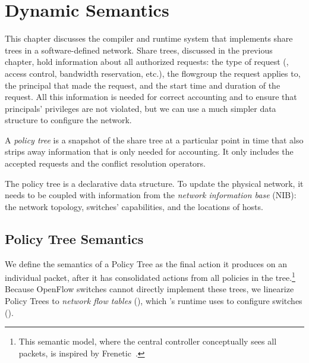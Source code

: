 \chapter{Dynamic Semantics}
\label{sec:PolicyTrees}


This chapter discusses the \sys compiler and runtime system that
implements share trees in a software-defined network.  Share trees,
discussed in the previous chapter, hold information about all
authorized requests: the type of request (\eg, access control,
bandwidth reservation, etc.), the flowgroup the request applies to,
the principal that made the request, and the start time and duration
of the request. All this information is needed for correct accounting
and to ensure that principals' privileges are not violated, but we can
use a much simpler data structure to configure the network.

  A \emph{policy tree} is a snapshot of
the share tree at a particular point in time that also strips away
information that is only needed for accounting. It only includes the
accepted requests and the conflict resolution operators.

The policy tree is a declarative data structure. To update the physical
network, it needs to be coupled with information from the
\emph{network information base} (NIB): the network topology, switches'
capabilities, and the locations of hosts.

\section{Policy Tree Semantics}
\label{sec:PolicyTree-Semantics}

We define the semantics of a Policy Tree as the
final action it produces on an individual packet, after it has
consolidated actions from all policies in the tree.\footnote{This
  semantic model, where the central controller conceptually sees all
  packets, is inspired by Frenetic~\cite{Foster:2010}.}
Because OpenFlow switches cannot directly implement these trees,
we linearize Policy Trees to \emph{network flow tables} (), which
\sys's runtime uses to configure switches ().


